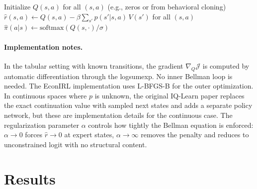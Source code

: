\documentclass[10pt]{article}
\begin{document}
\begin{algorithm}[H]
\DontPrintSemicolon
\caption{IQ-Learn (tabular DDC setting)}
\label{alg:iqlearn}
\BlankLine
Initialize $Q(s,a)$ for all $(s,a)$ (e.g., zeros or from behavioral cloning)\;
\BlankLine
{}
\BlankLine
{}
$\hat{r}(s,a) \leftarrow Q(s,a) - \beta\sum_{s'} p(s'|s,a)\,V(s')$ for all $(s,a)$\;
$\hat{\pi}(a|s) \leftarrow \text{softmax}(Q(s,\cdot)/\sigma)$\;
\BlankLine
{}
\end{algorithm}

\paragraph{Implementation notes.} In the tabular setting with known transitions, the gradient $\nabla_Q \mathcal{J}$ is computed by automatic differentiation through the logsumexp. No inner Bellman loop is needed. The EconIRL implementation uses L-BFGS-B for the outer optimization. In continuous spaces where $p$ is unknown, the original IQ-Learn paper replaces the exact continuation value with sampled next states and adds a separate policy network, but these are implementation details for the continuous case. The regularization parameter $\alpha$ controls how tightly the Bellman equation is enforced: $\alpha \to 0$ forces $\hat{r} \to 0$ at expert states, $\alpha \to \infty$ removes the penalty and reduces to unconstrained logit with no structural content.


\section{Results}
\label{sec:results}
\end{document}

